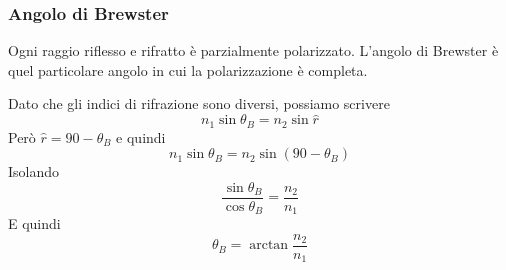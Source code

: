 \subsubsection{Angolo di Brewster}
Ogni raggio riflesso e rifratto è parzialmente polarizzato. L'angolo di Brewster è quel particolare
angolo in cui la polarizzazione è completa.
\begin{center}
\end{center}
Dato che gli indici di rifrazione sono diversi, possiamo scrivere
\begin{equation*}
  n_1\sin\theta_B = n_2\sin\hat{r}
\end{equation*}
Però $\hat{r} = 90-\theta_B$ e quindi
\begin{equation*}
  n_1\sin\theta_B = n_2\sin(90-\theta_B)
\end{equation*}
Isolando
\begin{equation*}
  \frac{\sin\theta_B}{\cos\theta_B} = \frac{n_2}{n_1}
\end{equation*}
E quindi
\begin{equation*}
  \theta_B = \arctan\frac{n_2}{n_1}
\end{equation*}
